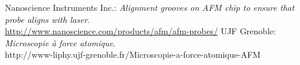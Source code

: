 \documentclass[a4paper, parskip=half, 12pt, bibliography=totocnumbered]{scrartcl}
\begin{document}

%

%

\begin{thebibliography}{10}
 Nanoscience Instruments Inc.: \emph{Alignment grooves on AFM chip to ensure that probe aligns with laser}.\\
\url{http://www.nanoscience.com/products/afm/afm-probes/}
 UJF Grenoble: \emph{Microscopie à force atomique}.\\
http://www-liphy.ujf-grenoble.fr/Microscopie-a-force-atomique-AFM
\end{thebibliography}
\end{document}
